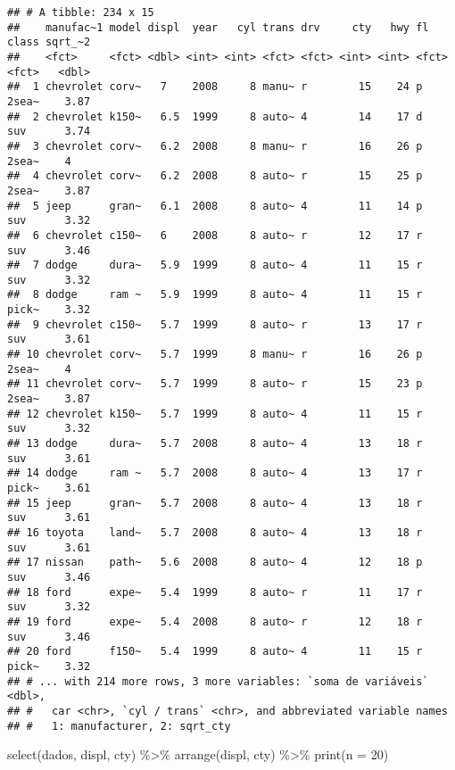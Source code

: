\documentclass[
]{book}
\newenvironment{Shaded}{\begin{snugshade}}{\end{snugshade}}
\newcommand{\AttributeTok}[1]{\textcolor[rgb]{0.77,0.63,0.00}{#1}}
\newcommand{\DecValTok}[1]{\textcolor[rgb]{0.00,0.00,0.81}{#1}}
\newcommand{\FunctionTok}[1]{\textcolor[rgb]{0.00,0.00,0.00}{#1}}
\newcommand{\NormalTok}[1]{#1}
\newcommand{\SpecialCharTok}[1]{\textcolor[rgb]{0.00,0.00,0.00}{#1}}
\begin{document}
\begin{verbatim}
## # A tibble: 234 x 15
##    manufac~1 model displ  year   cyl trans drv     cty   hwy fl    class sqrt_~2
##    <fct>     <fct> <dbl> <int> <int> <fct> <fct> <int> <int> <fct> <fct>   <dbl>
##  1 chevrolet corv~   7    2008     8 manu~ r        15    24 p     2sea~    3.87
##  2 chevrolet k150~   6.5  1999     8 auto~ 4        14    17 d     suv      3.74
##  3 chevrolet corv~   6.2  2008     8 manu~ r        16    26 p     2sea~    4   
##  4 chevrolet corv~   6.2  2008     8 auto~ r        15    25 p     2sea~    3.87
##  5 jeep      gran~   6.1  2008     8 auto~ 4        11    14 p     suv      3.32
##  6 chevrolet c150~   6    2008     8 auto~ r        12    17 r     suv      3.46
##  7 dodge     dura~   5.9  1999     8 auto~ 4        11    15 r     suv      3.32
##  8 dodge     ram ~   5.9  1999     8 auto~ 4        11    15 r     pick~    3.32
##  9 chevrolet c150~   5.7  1999     8 auto~ r        13    17 r     suv      3.61
## 10 chevrolet corv~   5.7  1999     8 manu~ r        16    26 p     2sea~    4   
## 11 chevrolet corv~   5.7  1999     8 auto~ r        15    23 p     2sea~    3.87
## 12 chevrolet k150~   5.7  1999     8 auto~ 4        11    15 r     suv      3.32
## 13 dodge     dura~   5.7  2008     8 auto~ 4        13    18 r     suv      3.61
## 14 dodge     ram ~   5.7  2008     8 auto~ 4        13    17 r     pick~    3.61
## 15 jeep      gran~   5.7  2008     8 auto~ 4        13    18 r     suv      3.61
## 16 toyota    land~   5.7  2008     8 auto~ 4        13    18 r     suv      3.61
## 17 nissan    path~   5.6  2008     8 auto~ 4        12    18 p     suv      3.46
## 18 ford      expe~   5.4  1999     8 auto~ r        11    17 r     suv      3.32
## 19 ford      expe~   5.4  2008     8 auto~ r        12    18 r     suv      3.46
## 20 ford      f150~   5.4  1999     8 auto~ 4        11    15 r     pick~    3.32
## # ... with 214 more rows, 3 more variables: `soma de variáveis` <dbl>,
## #   car <chr>, `cyl / trans` <chr>, and abbreviated variable names
## #   1: manufacturer, 2: sqrt_cty
\end{verbatim}

\begin{Shaded}
\begin{Highlighting}[]
\FunctionTok{select}\NormalTok{(dados, displ, cty) }\SpecialCharTok{\%\textgreater{}\%} 
  \FunctionTok{arrange}\NormalTok{(displ, cty) }\SpecialCharTok{\%\textgreater{}\%} 
  \FunctionTok{print}\NormalTok{(}\AttributeTok{n =} \DecValTok{20}\NormalTok{)}
\end{Highlighting}
\end{Shaded}
\end{document}
